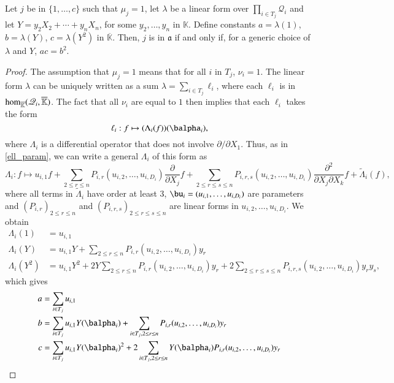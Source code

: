 \documentclass[final,1p,times,authoryear]{elsarticle}
\newcommand{\mf}{Y}
\newcommand{\residueI}{\mathscr{Q}}
\def\K{\mathbb{K}}
\def\K {\ensuremath{\mathbb{K}}}
\def\Kbar {{\ensuremath{\overline{\mathbb{K}}}}}
\begin{document}
\begin{lemma}\label{lemma:acb2}
  Let $j$ be in $\{1,\dots,c\}$ such that $\mu_j=1$, let $\lambda$ be
  a linear form over $\prod_{i \in T_j} \residueI_i$ and let $\mf=y_2
  X_2 + \cdots + y_n X_n$, for some $y_2,\dots,y_n$ in $\K$. Define constants
  $a=\lambda(1)$, $b=\lambda(\mf)$, $c=\lambda(\mf^2)$ in $\Kbar$.
  Then, $j$ is in $\mathfrak{a}$
  if and only if, for a generic choice of $\lambda$ and $\mf$, $ac=b^2$.
\end{lemma}
\begin{proof}
  The assumption that $\mu_j=1$ means that for all $i$ in $T_j$,
  $\nu_i=1$. The linear 
  form $\lambda$ can be uniquely written as a sum $\lambda=\sum_{i \in T_j}
  \ell_i$, where each $\ell_i$ is in ${\rm hom}_\Kbar(\residueI_i,\Kbar)$.
  The fact that all $\nu_i$ are equal to $1$ then implies that each $\ell_i$ takes the form 
  $$\ell_i: f \mapsto (\Lambda_{i}(f))(\balpha_i),$$
  where $\Lambda_{i}$ is a differential operator that does not 
  involve $\partial/\partial X_1$. Thus, as in \cref{ell_param}, we can write a general
  $\Lambda_i$ of this form as
  $$\Lambda_i: f \mapsto u_{i,1} f + \sum_{2 \le r \le n}
  P_{i,r}(u_{i,2},\dots,u_{i,D_i}) \frac{\partial}{\partial X_j} f +
  \sum_{2 \le r \le s \le n} P_{i,r,s}(u_{i,2},\dots,u_{i,D_i})
  \frac{\partial^2}{\partial X_j\partial X_k} f +
  \tilde\Lambda_i(f),$$ where all terms in $\tilde \Lambda_i$ have
  order at least $3$, $\bu_i=(u_{i,1},\dots,u_{i,D_i})$ are parameters and
  $(P_{i,r})_{2 \le r \le n}$ and $(P_{i,r,s})_{2 \le r \le s \le n}$
  are linear forms in $u_{i,2},\dots,u_{i,D_i}$.
  We obtain
  \begin{align*}
    \Lambda_i(1)   &= u_{i,1} \\
    \Lambda_i(\mf)   &= u_{i,1} \mf +\sum_{2 \le r \le n}P_{i,r}(u_{i,2},\dots,u_{i,D_i})y_r \\
    \Lambda_i(\mf^2) &= u_{i,1} \mf^2  +2 \mf \sum_{2 \le r \le n}P_{i,r}(u_{i,2},\dots,u_{i,D_i})y_r + 
    2\sum_{2 \le r \le s \le n} P_{i,r,s}(u_{i,2},\dots,u_{i,D_i})y_ry_s,
  \end{align*}
  which gives
  \begin{align*}
    a &= \sum_{i\in T_j}u_{i,1} \\
    b &= \sum_{i\in T_j}u_{i,1} \mf(\balpha_i) +\sum_{i \in T_j, 2 \le r \le n}P_{i,r}(u_{i,2},\dots,u_{i,D_i})y_r \\
    c &= \sum_{i\in T_j}u_{i,1} \mf(\balpha_i)^2
        +2 \sum_{i \in T_j, 2 \le r \le n}\mf(\balpha_i) P_{i,r}(u_{i,2},\dots,u_{i,D_i})y_r    

\end{align*}
\end{proof}
\end{document}
